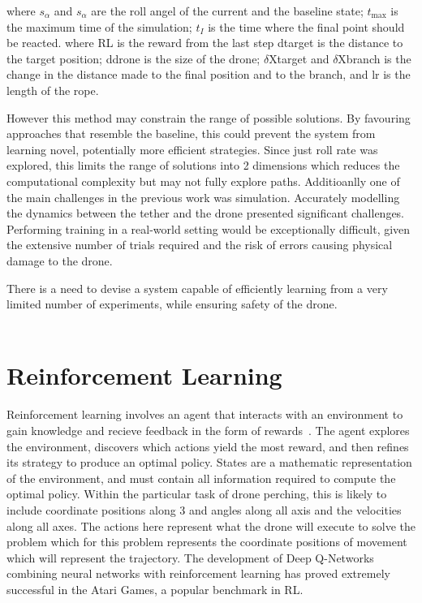 where $s_{\alpha}$ and $s_{\alpha}$ are the roll angel of the current and the baseline state; 
$t_{\max}$ is the maximum time of the simulation; 
$t_{I}$ is the time where the final point should be reacted.
where RL is the reward from the last step dtarget is the distance to the target position; 
ddrone is the size of the drone; 
$\delta$Xtarget and $\delta$Xbranch is the change in the distance made to the final position and to the branch, and lr is the length of the rope.

However this method may constrain the range of possible solutions.
By favouring approaches that resemble the baseline, this could prevent the system from learning novel, potentially more efficient strategies.
Since just roll rate was explored, this limits the range of solutions into 2 dimensions which reduces the computational complexity but may not fully explore paths.
Additioanlly one of the main challenges in the previous work was simulation.
Accurately modelling the dynamics between the tether and the drone presented significant challenges.
Performing training in a real-world setting would be exceptionally difficult, given the extensive number of trials required and the risk of errors causing physical damage to the drone.

There is a need to devise a system capable of efficiently learning from a very limited number of experiments, while ensuring safety of the drone. \\\\

\section{Reinforcement Learning}
Reinforcement learning involves an agent that interacts with an environment to gain knowledge and recieve feedback in the form of rewards~\cite{rlIntroSuttonBarlo}.
The agent explores the environment, discovers which actions yield the most reward, and then refines its strategy to produce an optimal policy.
States are a mathematic representation of the environment, and must contain all information required to compute the optimal policy.
Within the particular task of drone perching, this is likely to include coordinate positions along 3 and angles along all axis and the velocities along all axes.
The actions here represent what the drone will execute to solve the problem which for this problem represents the coordinate positions of movement which will represent the trajectory.
The development of Deep Q-Networks combining neural networks with reinforcement learning has proved extremely successful in the Atari Games, a popular benchmark in RL.

